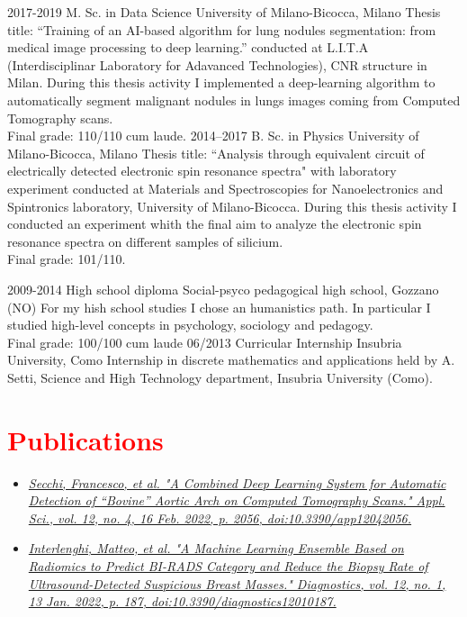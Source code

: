\documentclass[a4paper]{friggeri-cv}
\begin{document}
\begin{entrylist}
  \entry
    {2017-2019}
    {M. Sc. in Data Science}
    {University of Milano-Bicocca, Milano}
    {Thesis title: ``Training of an AI-based algorithm for lung nodules segmentation: from medical image processing to deep learning.'' conducted at L.I.T.A (Interdisciplinar Laboratory for Adavanced Technologies), CNR structure in Milan. During this thesis activity I implemented a deep-learning algorithm to automatically segment malignant nodules in lungs images coming from Computed Tomography scans.\\
    Final grade: 110/110 cum laude.}
  \entry
    {2014–2017}
    {B. Sc. in Physics}
    {University of Milano-Bicocca, Milano}
    {Thesis title: ``Analysis through equivalent circuit of electrically detected electronic spin resonance spectra" with laboratory experiment conducted at Materials and Spectroscopies for Nanoelectronics and Spintronics laboratory, University of Milano-Bicocca. During this thesis activity I conducted an experiment whith the final aim to analyze the electronic spin resonance spectra on different samples of silicium.\\
    Final grade: 101/110. }
\end{entrylist}
\clearpage
\begin{entrylist}
  \entry
    {2009-2014}
    {High school diploma}
    {Social-psyco pedagogical high school, Gozzano (NO)}
    {For my hish school studies I chose an humanistics path. In particular I studied high-level concepts in psychology, sociology and pedagogy.\\
    Final grade: 100/100 cum laude}
  \entry
    {06/2013}
    {Curricular Internship}
    {Insubria University, Como}
    {Internship in discrete mathematics and applications held by A. Setti, Science and High Technology department, Insubria University (Como).}
\end{entrylist}

\section{\textcolor{red}{Publications}}
\begin{itemize}
	\item \href{https://www.mdpi.com/2076-3417/12/4/2056/htm}{\textit{Secchi, Francesco, et al. "A Combined Deep Learning System for Automatic Detection of “Bovine” Aortic Arch on Computed Tomography Scans." Appl. Sci., vol. 12, no. 4, 16 Feb. 2022, p. 2056, doi:10.3390/app12042056.}}
	\item \href{https://www.mdpi.com/2075-4418/12/1/187/htm}{\textit{Interlenghi, Matteo, et al. "A Machine Learning Ensemble Based on Radiomics to Predict BI-RADS Category and Reduce the Biopsy Rate of Ultrasound-Detected Suspicious Breast Masses." Diagnostics, vol. 12, no. 1, 13 Jan. 2022, p. 187, doi:10.3390/diagnostics12010187.}}
\end{itemize}
\end{document}
